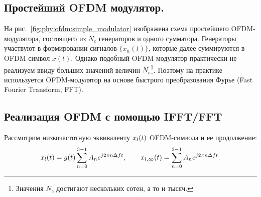 \documentclass{book}
\numberwithin{theorem}{chapter}
\numberwithin{statement}{chapter}
\numberwithin{lemma}{chapter}
\theoremstyle{definition}
\numberwithin{task}{chapter}
\theoremstyle{remark}
\numberwithin{example}{chapter}
\theoremstyle{definition}
\numberwithin{definition}{chapter}
\theoremstyle{remark}
\theoremstyle{remark}
\numberwithin{lyrics}{section}
\begin{document}
\subsection{Простейший OFDM модулятор.}
На рис.~\ref{fig:phy:ofdm:simple_modulator} изображена схема простейшего OFDM-модулятора, состоящего из $N_c$ генераторов и одного сумматора. Генераторы участвуют в формировании сигналов $\{x_n(t)\}$, которые далее суммируются в OFDM-символ $x(t)$. Однако подобный OFDM-модулятор практически не реализуем ввиду больших значений величин $N_c$\footnote{Значения $N_c$ достигают нескольких сотен, а то и тысяч.}. Поэтому на практике используется OFDM-модулятор на основе быстрого преобразования Фурье (Fast Fourier Transform, FFT).

\subsection{Реализация OFDM с помощью IFFT/FFT}
\label{sec:phy:ofdm:ifft_fft}

Рассмотрим низкочастотную эквиваленту $x_{l}(t)$ OFDM-символа и ее продолжение:
\begin{equation}
\label{eq:phy:ofdm:ofdm_symbol_f0}
x_{l}(t) = 
g(t)\sum\limits_{n = 0}^{3 - 1} A_{n} e^{j2\pi n \Delta f t},\qquad x_{l, \infty}(t) = 
\sum\limits_{n = 0}^{3 - 1} A_{n} e^{j2\pi n \Delta f t}.
\end{equation}
\end{document}
